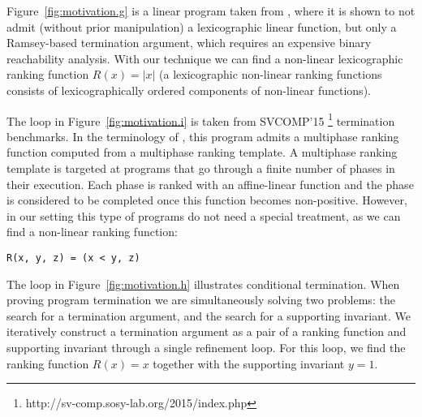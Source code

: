 \documentclass[preprint]{sigplanconf}
\theoremstyle{definition}
\begin{document}
Figure~\ref{fig:motivation.g} is a linear program taken from \cite{DBLP:conf/tacas/CookSZ13}, 
where it is shown to not admit (without prior manipulation) a lexicographic linear function, but only a Ramsey-based termination argument,
which requires an expensive binary reachability analysis.
With our technique we can find a non-linear lexicographic ranking function $R(x) = |x|$ 
(a lexicographic non-linear ranking functions consists of lexicographically ordered components
of non-linear functions). 


The loop in Figure~\ref{fig:motivation.i} is taken from SVCOMP'15  \footnote{http://sv-comp.sosy-lab.org/2015/index.php} termination benchmarks.
In the terminology of \cite{DBLP:conf/tacas/LeikeH14}, this program admits a multiphase ranking function computed from a multiphase ranking template.
A multiphase ranking template is targeted at programs that go through a
finite number of phases in their execution. Each phase is ranked with
an affine-linear function and the phase is considered to be completed once this
function becomes non-positive.
However, in our setting this type of programs do not need a special treatment, as we can find a non-linear ranking function:
\begin{verbatim}
R(x, y, z) = (x < y, z)
\end{verbatim}

The loop in Figure~\ref{fig:motivation.h} illustrates conditional termination.
When proving program termination we are simultaneously solving two problems:
the search for a termination argument, and the search for a supporting invariant.
We iteratively construct a termination argument as a pair of a ranking function and supporting invariant through a single refinement loop.
For this loop, we find the ranking function $R(x) = x$ together with the supporting invariant $y=1$.
\end{document}
